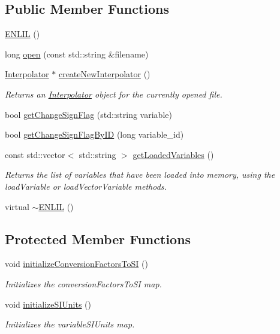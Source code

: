 \subsection*{Public Member Functions}
\begin{DoxyCompactItemize}
\item 
\hyperlink{classccmc_1_1_e_n_l_i_l_a38a8d599775cb5da6be25288b9bb5ae1}{E\-N\-L\-I\-L} ()
\item 
long \hyperlink{classccmc_1_1_e_n_l_i_l_a7a1ec843b7fc7a86d6b8e2ac3d65b41f}{open} (const std\-::string \&filename)
\item 
\hyperlink{classccmc_1_1_interpolator}{Interpolator} $\ast$ \hyperlink{classccmc_1_1_e_n_l_i_l_a861fdf6c5b4f73d0e0b4cfc66f55598b}{create\-New\-Interpolator} ()
\begin{DoxyCompactList}\small\item\em Returns an \hyperlink{classccmc_1_1_interpolator}{Interpolator} object for the currently opened file. \end{DoxyCompactList}\item 
bool \hyperlink{classccmc_1_1_e_n_l_i_l_a109de918c637e24533e88100f1ae53bd}{get\-Change\-Sign\-Flag} (std\-::string variable)
\item 
bool \hyperlink{classccmc_1_1_e_n_l_i_l_a93e9e996febbd953b69b6e7c30b999ac}{get\-Change\-Sign\-Flag\-By\-I\-D} (long variable\-\_\-id)
\item 
const std\-::vector$<$ std\-::string $>$ \hyperlink{classccmc_1_1_e_n_l_i_l_a7ca1f6462dca9d534781d4b8c4206d35}{get\-Loaded\-Variables} ()
\begin{DoxyCompactList}\small\item\em Returns the list of variables that have been loaded into memory, using the load\-Variable or load\-Vector\-Variable methods. \end{DoxyCompactList}\item 
virtual \hyperlink{classccmc_1_1_e_n_l_i_l_a7f0df091dd0047b5c3401a22f362e0d6}{$\sim$\-E\-N\-L\-I\-L} ()
\end{DoxyCompactItemize}
\subsection*{Protected Member Functions}
\begin{DoxyCompactItemize}
\item 
void \hyperlink{classccmc_1_1_e_n_l_i_l_afff7548cddd78a77eaa0322a45415ab6}{initialize\-Conversion\-Factors\-To\-S\-I} ()
\begin{DoxyCompactList}\small\item\em Initializes the conversion\-Factors\-To\-S\-I map. \end{DoxyCompactList}\item 
void \hyperlink{classccmc_1_1_e_n_l_i_l_aa4d5d805912f4abfdd65083424ebb000}{initialize\-S\-I\-Units} ()
\begin{DoxyCompactList}\small\item\em Initializes the variable\-S\-I\-Units map. \end{DoxyCompactList}\end{DoxyCompactItemize}
